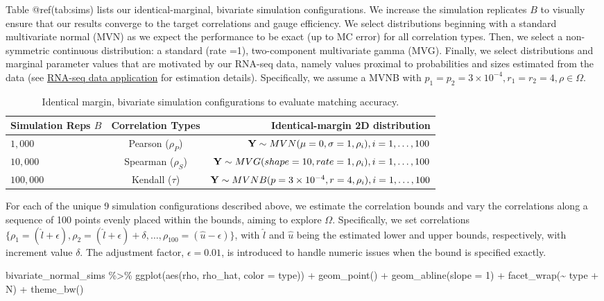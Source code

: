 \documentclass{article}
\newenvironment{Shaded}{\begin{snugshade}}{\end{snugshade}}
\newcommand{\AttributeTok}[1]{\textcolor[rgb]{0.77,0.63,0.00}{#1}}
\newcommand{\DecValTok}[1]{\textcolor[rgb]{0.00,0.00,0.81}{#1}}
\newcommand{\FunctionTok}[1]{\textcolor[rgb]{0.00,0.00,0.00}{#1}}
\newcommand{\NormalTok}[1]{#1}
\newcommand{\SpecialCharTok}[1]{\textcolor[rgb]{0.00,0.00,0.00}{#1}}
\begin{document}
Table @ref(tab:sims) lists our identical-marginal, bivariate simulation
configurations. We increase the simulation replicates \(B\) to visually
ensure that our results converge to the target correlations and gauge
efficiency. We select distributions beginning with a standard
multivariate normal (MVN) as we expect the performance to be exact (up
to MC error) for all correlation types. Then, we select a non-symmetric
continuous distribution: a standard (rate =1), two-component
multivariate gamma (MVG). Finally, we select distributions and marginal
parameter values that are motivated by our RNA-seq data, namely values
proximal to probabilities and sizes estimated from the data (see
\href{examples}{RNA-seq data application} for estimation details).
Specifically, we assume a MVNB with
\(p_1 = p_2 = 3\times10^{-4}, r_1 = r_2 = 4, \rho \in \Omega\).

\begin{table}[]
\centering
\caption{ \label{tab:sims} Identical margin, bivariate simulation configurations to evaluate matching accuracy.}
\begin{tabular}{@{}lcr@{}}
\toprule
Simulation Reps $B$ & Correlation Types & Identical-margin 2D distribution \\ \midrule
$1,000$ & Pearson ($\rho_P$) & ${\bf Y} \sim MVN( \mu= 0 , \sigma = 1, \rho_i ), i=1,\ldots,100$ \\
$10,000$ & Spearman ($\rho_S$) & ${\bf Y} \sim MVG( shape = 10, rate = 1, \rho_i ), i=1,\ldots,100$ \\
$100,000$ & Kendall ($\tau$) & ${\bf Y} \sim MVNB(p = 3\times10^{-4}, r = 4,\rho_i), i=1,\ldots,100$ \\ \bottomrule
\end{tabular}
\end{table}

For each of the unique 9 simulation configurations described above, we
estimate the correlation bounds and vary the correlations along a
sequence of 100 points evenly placed within the bounds, aiming to
explore \(\Omega\). Specifically, we set correlations
\(\{ \rho_1 = ( \hat{l} + \epsilon), \rho_2 = (\hat{l} + \epsilon) + \delta, \ldots, \rho_{100} = (\hat{u} - \epsilon) \}\),
with \(\hat{l}\) and \(\hat{u}\) being the estimated lower and upper
bounds, respectively, with increment value \(\delta\). The adjustment
factor, \(\epsilon=0.01\), is introduced to handle numeric issues when
the bound is specified exactly.

\begin{Shaded}
\begin{Highlighting}[]
\NormalTok{bivariate\_normal\_sims }\SpecialCharTok{\%\textgreater{}\%}
    \FunctionTok{ggplot}\NormalTok{(}\FunctionTok{aes}\NormalTok{(rho, rho\_hat, }\AttributeTok{color =}\NormalTok{ type)) }\SpecialCharTok{+}
    \FunctionTok{geom\_point}\NormalTok{() }\SpecialCharTok{+}
    \FunctionTok{geom\_abline}\NormalTok{(}\AttributeTok{slope =} \DecValTok{1}\NormalTok{) }\SpecialCharTok{+}
    \FunctionTok{facet\_wrap}\NormalTok{(}\SpecialCharTok{\textasciitilde{}}\NormalTok{ type }\SpecialCharTok{+}\NormalTok{ N) }\SpecialCharTok{+} 
    \FunctionTok{theme\_bw}\NormalTok{()}
\end{Highlighting}
\end{Shaded}
\end{document}
